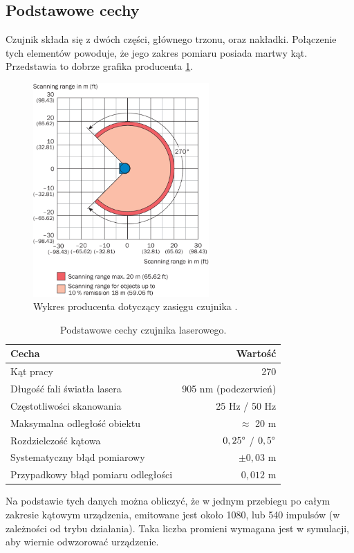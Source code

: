 	\subsection{Podstawowe cechy}
		Czujnik składa się z dwóch części, głównego trzonu, oraz nakładki.
		Połączenie tych elementów powoduje, że jego zakres pomiaru posiada martwy kąt.
		Przedstawia to dobrze grafika producenta \ref{fig:lidar}.
		\begin{figure}[h]
		\centering
		\includegraphics[width=0.6\textwidth]{graphics/sick.png}
		\caption{Wykres producenta dotyczący zasięgu czujnika \cite{sick_website}.}
		\label{fig:lidar}
		\end{figure} 
		
		\begin{table}
		\centering
		\begin{tabular}{l r}
		Cecha & Wartość \\
		\hline
		Kąt pracy & 270\textdegree \\
		Długość fali światła lasera & 905 nm (podczerwień) \\
		Częstotliwości skanowania & 25 Hz / 50 Hz \\
		Maksymalna odległość obiektu & $\approx$ 20 m \\
		Rozdzielczość kątowa & $0,25 \degree$ / $0,5 \degree $ \\
		Systematyczny błąd pomiarowy & $\pm 0,03$ m \\
		Przypadkowy błąd pomiaru odległości & $0,012$ m \\
		\end{tabular}
		\caption{Podstawowe cechy czujnika laserowego.}
		\label{tab:lidar}
		\end{table}
		Na podstawie tych danych można obliczyć, że w jednym przebiegu po całym zakresie kątowym urządzenia, 
		emitowane jest około 1080, lub 540 impulsów (w zależności od trybu działania).
		Taka liczba promieni wymagana jest w symulacji, aby wiernie odwzorować urządzenie.

